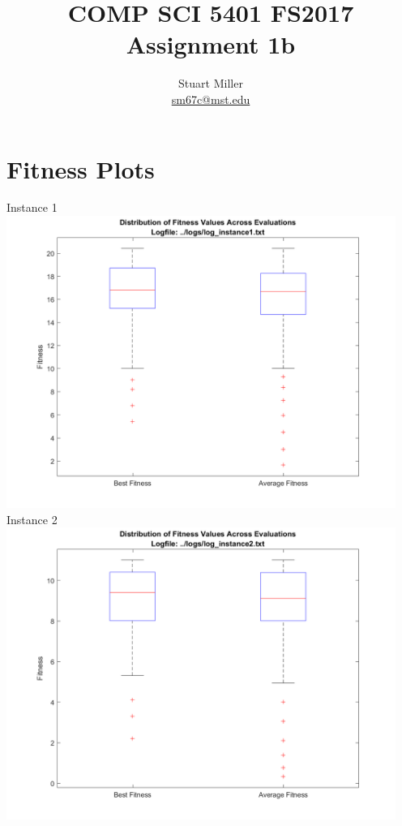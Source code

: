 \documentclass[11pt]{article}
\begin{document}
\title{COMP SCI 5401 FS2017 Assignment 1b}
\author{Stuart Miller\\\href{mailto:sm67c@mst.edu}{sm67c@mst.edu}}
\maketitle

\section{Fitness Plots}

\begin{center}
Instance 1\\
\includegraphics[width=5in]{graph_1.png}\\
\newpage Instance 2\\
\includegraphics[width=5in]{graph_2.png}\\

\end{center}
\end{document}
